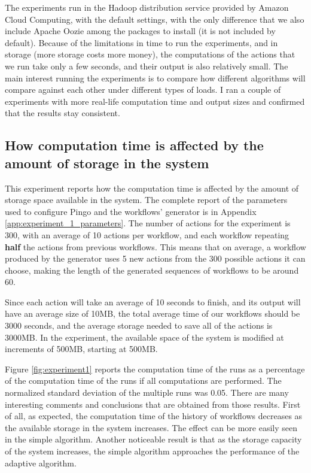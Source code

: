 The experiments run in the Hadoop distribution service provided by Amazon Cloud Computing, with the default settings, with the only difference that we also include Apache Oozie among the packages to install (it is not included by default).  Because of the limitations in time to run the experiments, and in storage (more storage costs more money), the computations of the actions that we run take only a few seconds, and their output is also relatively small.  The main interest running the experiments is to compare how different algorithms will compare against each other under different types of loads.  I ran a couple of experiments with more real-life computation time and output sizes and confirmed that the results stay consistent.

\subsection{How computation time is affected by the amount of storage in the system}
This experiment reports how the computation time is affected by the amount of storage space available in the system. The complete report of the parameters used to configure Pingo and the workflows' generator is in Appendix \ref{app:experiment_1_parameters}.  The number of actions for the experiment is 300, with an average of 10 actions per workflow, and each workflow repeating \textbf{half} the actions from previous workflows.  This means that on average, a workflow produced by the generator uses 5 new actions from the 300 possible actions it can choose, making the length of the generated sequences of workflows to be around 60.

Since each action will take an average of 10 seconds to finish, and its output will have an average size of 10MB, the total average time of our workflows should be 3000 seconds, and the average storage needed to save all of the actions is 3000MB.  In the experiment, the available space of the system is modified at increments of 500MB, starting at 500MB. 

Figure \ref{fig:experiment1} reports the computation time of the runs as a percentage of the computation time of the runs if all computations are performed. The normalized standard deviation of the multiple runs was 0.05. There are many interesting comments and conclusions that are obtained from those results. First of all, as expected, the computation time of the history of workflows decreases as the available storage in the system increases.  The effect can be more easily seen in the simple algorithm.  Another noticeable result is that as the storage capacity of the system increases, the simple algorithm approaches the performance of the adaptive algorithm.

